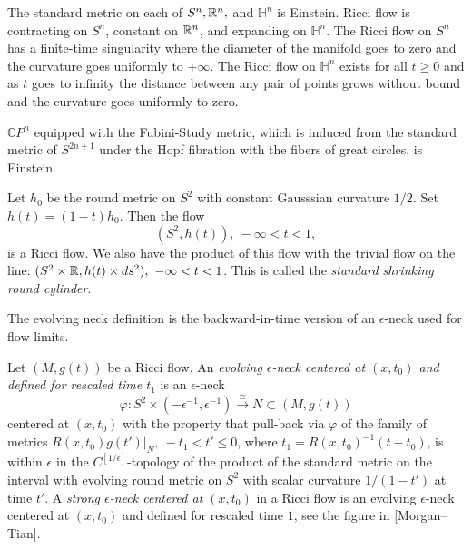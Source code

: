 \begin{example}\label{ex:einstein-ricci-flow}


The standard metric on each of $S^{n}, \mathbb{R}^{n},$ and ${\mathbb
H}^{n}$ is Einstein. Ricci flow is contracting on $S^n$, constant on
$\mathbb{R}^n$, and expanding on ${\mathbb H}^n$. The Ricci flow on $S^n$
has a finite-time singularity where the diameter of the manifold
goes to zero and the curvature goes uniformly to $+\infty$. The
Ricci flow on ${\mathbb H}^n$ exists for all $t\ge 0$ and as $t$
goes to infinity the distance between any pair of points grows
without bound and the curvature goes uniformly to zero.
\end{example}

\begin{example}\label{ex:fubini-study-metric}


$\mathbb{C}P^{n}$ equipped with the Fubini-Study metric, which is induced
from the standard metric of $S^{2n+1}$ under the Hopf fibration with the fibers
of great circles, is Einstein.
\end{example}


\begin{example}\label{ex:shrinking-round-cylinder}


Let $h_0$ be the round metric on $S^2$ with constant Gausssian
curvature $1/2$. Set $h(t)=(1-t)h_0$. Then the flow $$(S^2,h(t)),\
-\infty<t<1,$$ is a Ricci flow. We also have the product of this flow
with the trivial flow on the line: $(S^2\times \mathbb{R},h(t)\times
ds^2),\ -\infty<t<1$. This is called the {\em standard shrinking
round cylinder}.
\end{example}

The evolving neck definition is the backward-in-time version of an
$\epsilon$-neck used for flow limits.


\begin{definition}\label{def:evolving-epsilon-neck}
\uses{def:epsilon-neck}
\label{strongepsneck}



Let $(M,g(t))$ be a Ricci flow. An {\em evolving $\epsilon$-neck
centered at $(x,t_0)$ and defined for rescaled time
$t_1$} is an $\epsilon$-neck
$$\varphi\colon S^2\times
(-\epsilon^{-1},\epsilon^{-1})\xrightarrow{\cong}
N\subset (M,g(t))$$ centered at $(x,t_0)$ with the property that
pull-back via $\varphi$ of the family of metrics $R(x,t_0)g(t')|_N,\
-t_1< t'\le 0$, where $t_1=R(x,t_0)^{-1}(t-t_0)$, is within
$\epsilon$ in the $C^{[1/\epsilon]}$-topology of the product of the
standard metric on the interval with evolving round metric on $S^2$
with scalar curvature $1/(1-t')$ at time $t'$. A {\em strong
$\epsilon$-neck centered at
$(x,t_0)$} in a Ricci flow is an
evolving $\epsilon$-neck centered at $(x,t_0)$ and defined for
rescaled time $1$, see the figure in [Morgan--Tian].
\end{definition}


